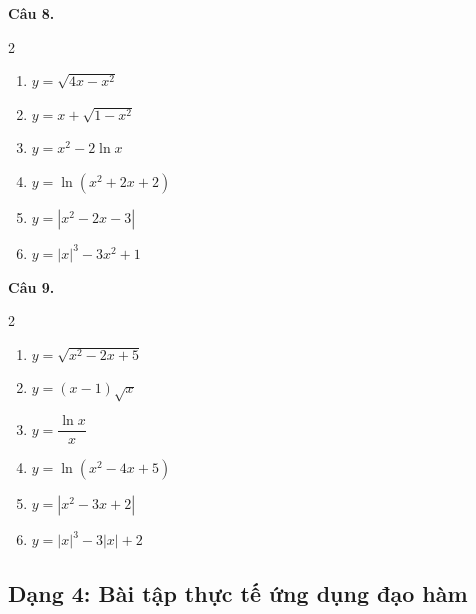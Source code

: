 \documentclass[12pt]{article}
\begin{document}
	\begin{btvang}
		\textbf{Câu 8.}
		\begin{multicols}{2}
			\begin{enumerate}[label=\alph*)]
				\item $y = \sqrt{4x - x^2}$
				\item $y = x + \sqrt{1 - x^2}$
				\item $y = x^2 - 2\ln x$
				\item $y = \ln(x^2 + 2x + 2)$
				\item $y = |x^2 - 2x - 3|$
				\item $y = |x|^3 - 3x^2 + 1$
			\end{enumerate}
		\end{multicols}
	\end{btvang}
	
	\begin{btdo}
		\textbf{Câu 9.}
		\begin{multicols}{2}
			\begin{enumerate}[label=\alph*)]
				\item $y = \sqrt{x^2 - 2x + 5}$
				\item $y = (x - 1)\sqrt{x}$
				\item $y = \dfrac{\ln x}{x}$
				\item $y = \ln(x^2 - 4x + 5)$
				\item $y = |x^2 - 3x + 2|$
				\item $y = |x|^3 - 3|x| + 2$
			\end{enumerate}
		\end{multicols}
	\end{btdo}
	
	
	\subsection{Dạng 4: Bài tập thực tế ứng dụng đạo hàm}
	
\end{document}
